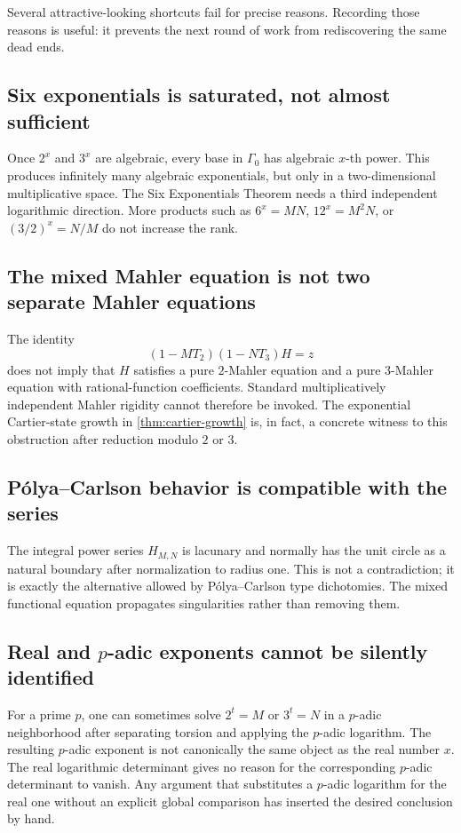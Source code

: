 \documentclass[11pt]{article}
\theoremstyle{definition}
\newcommand{\Gammao}{\Gamma_0}
\begin{document}
Several attractive-looking shortcuts fail for precise reasons.  Recording
those reasons is useful: it prevents the next round of work from rediscovering
the same dead ends.

\subsection{Six exponentials is saturated, not almost sufficient}

Once $2^x$ and $3^x$ are algebraic, every base in $\Gammao$ has algebraic
$x$-th power.  This produces infinitely many algebraic exponentials, but only
in a two-dimensional multiplicative space.  The Six Exponentials Theorem needs
a third independent logarithmic direction.  More products such as
$6^x=MN$, $12^x=M^2N$, or $(3/2)^x=N/M$ do not increase the rank.

\subsection{The mixed Mahler equation is not two separate Mahler equations}

The identity
\[
 (1-MT_2)(1-NT_3)H=z
\]
does not imply that $H$ satisfies a pure $2$-Mahler equation and a pure
$3$-Mahler equation with rational-function coefficients.  Standard
multiplicatively independent Mahler rigidity cannot therefore be invoked.
The exponential Cartier-state growth in \cref{thm:cartier-growth} is, in fact,
a concrete witness to this obstruction after reduction modulo $2$ or $3$.

\subsection{P\'olya--Carlson behavior is compatible with the series}

The integral power series $H_{M,N}$ is lacunary and normally has the unit
circle as a natural boundary after normalization to radius one.  This is not a
contradiction; it is exactly the alternative allowed by P\'olya--Carlson type
dichotomies.  The mixed functional equation propagates singularities rather
than removing them.

\subsection{Real and $p$-adic exponents cannot be silently identified}

For a prime $p$, one can sometimes solve $2^t=M$ or $3^t=N$ in a $p$-adic
neighborhood after separating torsion and applying the $p$-adic logarithm.
The resulting $p$-adic exponent is not canonically the same object as the real
number $x$.  The real logarithmic determinant gives no reason for the
corresponding $p$-adic determinant to vanish.  Any argument that substitutes a
$p$-adic logarithm for the real one without an explicit global comparison has
inserted the desired conclusion by hand.
\end{document}

